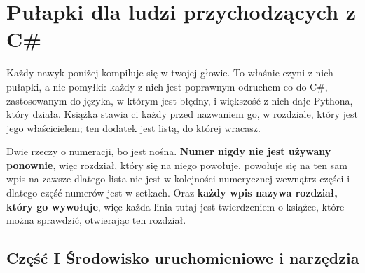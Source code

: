 
\chapter{Pułapki dla ludzi przychodzących z C\#}
\label{app:traps}

\noindent
Każdy nawyk poniżej kompiluje się w twojej głowie. To właśnie czyni z nich
pułapki, a nie pomyłki: każdy z nich jest poprawnym odruchem co do C\#,
zastosowanym do języka, w którym jest błędny, i większość z nich daje
Pythona, który działa. Książka stawia ci każdy przed nazwaniem go, w
rozdziale, który jest jego właścicielem; ten dodatek jest listą, do której
wracasz.

Dwie rzeczy o numeracji, bo jest nośna. \textbf{Numer nigdy nie jest
używany ponownie}, więc rozdział, który się na niego powołuje, powołuje się
na ten sam wpis na zawsze \dash{} dlatego lista nie jest w kolejności
numerycznej wewnątrz części i dlatego część numerów jest w setkach. Oraz
\textbf{każdy wpis nazywa rozdział, który go wywołuje}, więc każda linia
tutaj jest twierdzeniem o książce, które można sprawdzić, otwierając ten
rozdział.

\section{Część I \dash{} Środowisko uruchomieniowe i narzędzia}
\label{sec:appB-part1}




